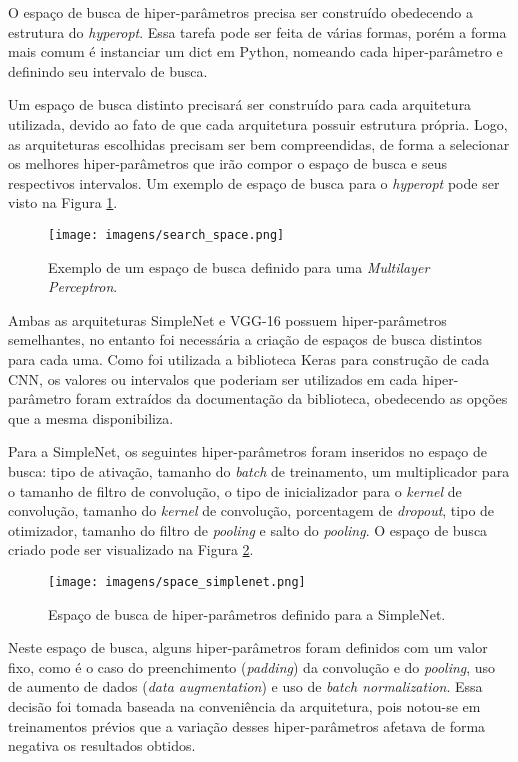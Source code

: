\documentclass[
12pt,       %
openright,      %
oneside,      %
a4paper,      %
english,      %
french,       %
spanish,      %
brazil        %
]{abntex2}
\begin{document}
O espaço de busca de hiper-parâmetros precisa ser construído obedecendo a estrutura do \textit{hyperopt}. Essa tarefa pode ser feita de várias formas, porém a forma mais comum é instanciar um dict em Python, nomeando cada hiper-parâmetro e definindo seu intervalo de busca. 

Um espaço de busca distinto precisará ser construído para cada arquitetura utilizada, devido ao fato de que cada arquitetura possuir estrutura própria. Logo, as arquiteturas escolhidas precisam ser bem compreendidas, de forma a selecionar os melhores hiper-parâmetros que irão compor o espaço de busca e seus respectivos intervalos. Um exemplo de espaço de busca para o \textit{hyperopt} pode ser visto na Figura \ref{fig:search_space}.

\begin{figure}[ht]
\centering
\caption{Exemplo de um espaço de busca definido para uma \textit{Multilayer Perceptron}.}
\texttt{[image: imagens/search\_space.png]}
\label{fig:search_space}
\end{figure}

Ambas as arquiteturas SimpleNet e VGG-16 possuem hiper-parâmetros semelhantes, no entanto foi necessária a criação de espaços de busca distintos para cada uma. Como foi utilizada a biblioteca Keras para construção de cada CNN, os valores ou intervalos que poderiam ser utilizados em cada hiper-parâmetro foram extraídos da documentação da biblioteca, obedecendo as opções que a mesma disponibiliza.

Para a SimpleNet, os seguintes hiper-parâmetros foram inseridos no espaço de busca: tipo de ativação, tamanho do \textit{batch} de treinamento, um multiplicador para o tamanho de filtro de convolução, o tipo de inicializador para o \textit{kernel} de convolução, tamanho do \textit{kernel} de convolução, porcentagem de \textit{dropout}, tipo de otimizador, tamanho do filtro de \textit{pooling} e salto do \textit{pooling}. O espaço de busca criado pode ser visualizado na Figura \ref{fig:space_simplenet}.

\begin{figure}[ht]
\centering
\caption{Espaço de busca de hiper-parâmetros definido para a SimpleNet.}
\texttt{[image: imagens/space\_simplenet.png]}
\label{fig:space_simplenet}
\end{figure}

Neste espaço de busca, alguns hiper-parâmetros foram definidos com um valor fixo, como é o caso do preenchimento (\textit{padding}) da convolução e do \textit{pooling}, uso de aumento de dados (\textit{data augmentation}) e uso de \textit{batch normalization}. Essa decisão foi tomada baseada na conveniência da arquitetura, pois notou-se em treinamentos prévios que a variação desses hiper-parâmetros afetava de forma negativa os resultados obtidos.
\end{document}
